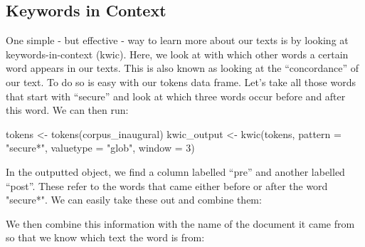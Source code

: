 \documentclass[
]{article}
\newenvironment{Shaded}{\begin{snugshade}}{\end{snugshade}}
\newcommand{\AttributeTok}[1]{\textcolor[rgb]{0.77,0.63,0.00}{#1}}
\newcommand{\DecValTok}[1]{\textcolor[rgb]{0.00,0.00,0.81}{#1}}
\newcommand{\FunctionTok}[1]{\textcolor[rgb]{0.00,0.00,0.00}{#1}}
\newcommand{\NormalTok}[1]{#1}
\newcommand{\OtherTok}[1]{\textcolor[rgb]{0.56,0.35,0.01}{#1}}
\newcommand{\SpecialCharTok}[1]{\textcolor[rgb]{0.00,0.00,0.00}{#1}}
\newcommand{\StringTok}[1]{\textcolor[rgb]{0.31,0.60,0.02}{#1}}
\begin{document}
\hypertarget{keywords-in-context}{%
\subsection{Keywords in Context}\label{keywords-in-context}}

One simple - but effective - way to learn more about our texts is by looking at keywords-in-context (kwic). Here, we look at with which other words a certain word appears in our texts. This is also known as looking at the ``concordance'' of our text. To do so is easy with our tokens data frame. Let's take all those words that start with ``secure'' and look at which three words occur before and after this word. We can then run:

\begin{Shaded}
\begin{Highlighting}[]
\NormalTok{tokens }\OtherTok{\textless{}{-}} \FunctionTok{tokens}\NormalTok{(corpus\_inaugural)}
\NormalTok{kwic\_output }\OtherTok{\textless{}{-}} \FunctionTok{kwic}\NormalTok{(tokens, }\AttributeTok{pattern =} \StringTok{"secure*"}\NormalTok{, }\AttributeTok{valuetype =} \StringTok{"glob"}\NormalTok{, }\AttributeTok{window =} \DecValTok{3}\NormalTok{)}
\end{Highlighting}
\end{Shaded}

In the outputted object, we find a column labelled ``pre'' and another labelled ``post''. These refer to the words that came either before or after the word "secure*". We can easily take these out and combine them:

\begin{Shaded}
\end{Shaded}

We then combine this information with the name of the document it came from so that we know which text the word is from:

\begin{Shaded}
\end{Shaded}
\end{document}
